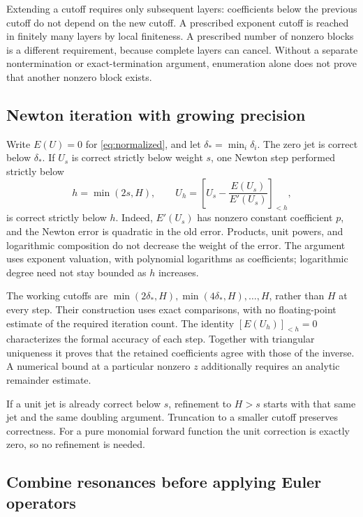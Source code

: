 Extending a cutoff requires only subsequent layers: coefficients below the
previous cutoff do not depend on the new cutoff. A prescribed exponent
cutoff is reached in finitely many layers by local finiteness. A prescribed
number of nonzero blocks is a different requirement, because complete
layers can cancel. Without a separate nontermination or exact-termination
argument, enumeration alone does not prove that another nonzero block exists.

\subsection{Newton iteration with growing precision}

Write $E(U)=0$ for \eqref{eq:normalized}, and let
$\delta_* = \min_i\delta_i$. The zero jet is correct below $\delta_*$.
If $U_s$ is correct strictly below weight $s$, one Newton step performed
strictly below
\[
 h=\min(2s,H),\qquad
 U_h=\left[U_s-\frac{E(U_s)}{E'(U_s)}\right]_{<h},
\]
is correct strictly below $h$. Indeed, $E'(U_s)$ has nonzero constant
coefficient $p$, and the Newton error is quadratic in the old error. Products,
unit powers, and logarithmic composition do not decrease the weight of the
error. The argument uses exponent valuation, with polynomial logarithms as
coefficients; logarithmic degree need not stay bounded as $h$ increases.

The working cutoffs are
$\min(2\delta_*,H),\min(4\delta_*,H),\ldots,H$, rather than $H$ at every
step. Their construction uses exact comparisons, with no floating-point
estimate of the required iteration count. The identity $[E(U_h)]_{<h}=0$ characterizes the formal accuracy of each step. Together with triangular uniqueness it proves that the retained coefficients agree with those of the inverse. A numerical bound at a particular nonzero $z$ additionally requires an analytic remainder estimate.

If a unit jet is already correct below $s$, refinement to $H>s$ starts with
that same jet and the same doubling argument. Truncation to a smaller
cutoff preserves correctness. For a pure monomial forward function the
unit correction is exactly zero, so no refinement is needed.

\subsection{Combine resonances before applying Euler operators}

